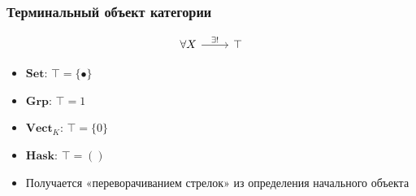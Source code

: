 \documentclass{beamer}
\begin{document}
\begin{frame}[fragile]
\frametitle{Терминальный объект категории}
\begin{equation}
\begin{tikzcd}
\forall X \arrow{r}{\exists!} & \top
\end{tikzcd}
\end{equation}
\begin{itemize}
\pause
\item \begin{math}\mathbf{Set}\end{math}: \begin{math}\top = \{\bullet\}\end{math}
\pause
\item \begin{math}\mathbf{Grp}\end{math}: \begin{math}\top = 1\end{math}
\pause
\item \begin{math}\mathbf{Vect}_K\end{math}: \begin{math}\top = \{0\}\end{math}
\pause
\item \begin{math}\mathbf{Hask}\end{math}: \begin{math}\top = ()\end{math}
\pause
\item Получается «переворачиванием стрелок» из определения начального объекта
\end{itemize}
\end{frame}
\end{document}
